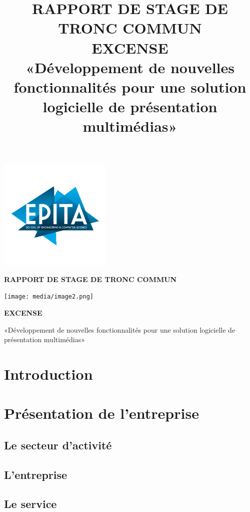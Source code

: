 \documentclass[12pt,a4paper]{report}
\title{RAPPORT DE STAGE DE TRONC COMMUN\\
       \large{EXCENSE}\\
       \large{«Développement de nouvelles fonctionnalités pour une solution logicielle de présentation multimédias»}}
\date{}
\begin{document}
\begin{titlepage}
\begin{center}
\includegraphics[width=0.4\textwidth]{media/image1.png}

\vspace{1cm}
{\huge\bfseries RAPPORT DE STAGE DE TRONC COMMUN\par}
\vspace{1cm}

\texttt{[image: media/image2.png]}

\vspace{1.5cm}
{\Large\bfseries EXCENSE\par}
\vspace{0.5cm}
{\large «Développement de nouvelles fonctionnalités pour une solution logicielle de présentation multimédias»\par}
\end{center}
\end{titlepage}

\tableofcontents
\newpage

\chapter{Introduction}

\chapter{Présentation de l'entreprise}
\section{Le secteur d'activité}
\section{L'entreprise}
\section{Le service}
\end{document}
